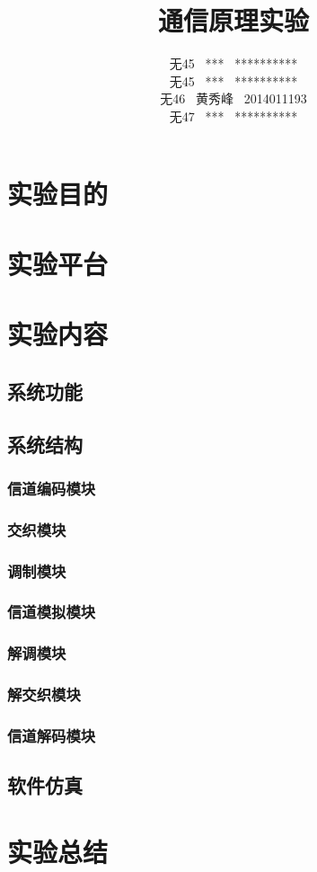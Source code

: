 \documentclass[UTF8]{ctexart}
\date{}
\title{\textbf{通信原理实验}}
\author{无45 \ *** \ **********\\
        无45 \ *** \ **********\\
        无46 \ 黄秀峰 \ 2014011193\\
        无47 \ *** \ **********}
\begin{document}
\maketitle

\section{实验目的}

\section{实验平台}

\section{实验内容}

\subsection{系统功能}

\subsection{系统结构}

\subsubsection{信道编码模块}

\subsubsection{交织模块}

\subsubsection{调制模块}

\subsubsection{信道模拟模块}

\subsubsection{解调模块}

\subsubsection{解交织模块}

\subsubsection{信道解码模块}

\subsection{软件仿真}

\section{实验总结}
\end{document}
